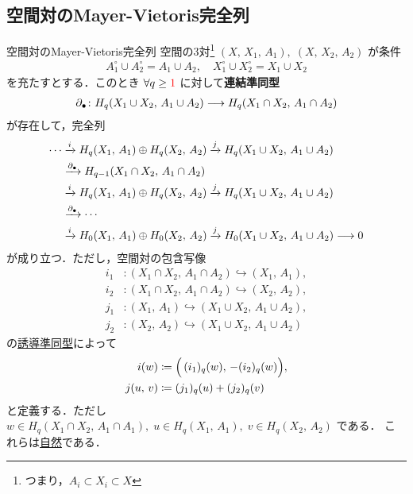\documentclass[algtopo_main]{subfiles}
\begin{document}
\subsection{空間対のMayer-Vietoris完全列}

\begin{mytheo}[label=thm:MV-rel, breakable]{空間対のMayer-Vietoris完全列}
    空間の3対\footnote{つまり，$A_i \subset X_i \subset X$} $(X,\, X_1,\, A_1),\; (X,\, X_2,\, A_2)$ が条件
    \begin{align}
        A_1^\circ \cup A_2^\circ = A_1 \cup A_2,\quad X_1^\circ \cup X_2^\circ = X_1 \cup X_2
    \end{align}
    を充たすとする．このとき $\forall q \ge \textcolor{red}{1}$ に対して\textbf{連結準同型}
    \begin{align}
        \partial_\bullet \colon H_q(X_1 \cup X_2,\, A_1 \cup A_2) \longrightarrow H_q(X_1 \cap X_2,\, A_1 \cap A_2)
    \end{align}
    が存在して，完全列
    \begin{align}
        \cdots &\xrightarrow{i} H_q(X_1,\, A_1) \oplus H_q(X_2,\, A_2) \xrightarrow{j} H_q (X_1 \cup X_2,\, A_1 \cup A_2) \\
        &\xrightarrow{\partial_\bullet} H_{q-1}(X_1 \cap X_2,\, A_1 \cap A_2) \\
        &\xrightarrow{i} H_q(X_1,\, A_1) \oplus H_q(X_2,\, A_2) \xrightarrow{j} H_q (X_1 \cup X_2,\, A_1 \cup A_2) \\
        &\xrightarrow{\partial_\bullet} \cdots \\
        &\xrightarrow{i} H_0(X_1,\, A_1) \oplus H_0(X_2,\, A_2) \xrightarrow{j} H_0 (X_1 \cup X_2,\, A_1 \cup A_2) \longrightarrow 0
    \end{align}
    が成り立つ．ただし，空間対の包含写像
    \begin{align}
        i_1 &\colon (X_1 \cap X_2,\, A_1 \cap A_2) \hookrightarrow (X_1,\, A_1), \\
        i_2 &\colon (X_1 \cap X_2,\, A_1 \cap A_2) \hookrightarrow (X_2,\, A_2), \\
        j_1 &\colon (X_1,\, A_1) \hookrightarrow (X_1 \cup X_2,\, A_1 \cup A_2), \\
        j_2 &\colon (X_2,\, A_2) \hookrightarrow (X_1 \cup X_2,\, A_1 \cup A_2) 
    \end{align}
    の\hyperref[eq:induced-rel]{誘導準同型}によって
    \begin{align}
        i(w) &\coloneqq \Bigl( \, (i_1)_q(w),\, -(i_2)_q(w) \Bigr), \\
        j(u,\, v) &\coloneqq (j_1)_q(u) + (j_2)_q(v)
    \end{align}
    と定義する．ただし $w \in H_q(X_1\cap X_2,\, A_1 \cap A_1),\; u \in H_q(X_1,\, A_1),\; v \in H_q(X_2,\, A_2)$ である．
    これらは\hyperref[def:nat]{自然}である．
\end{mytheo}
\end{document}
